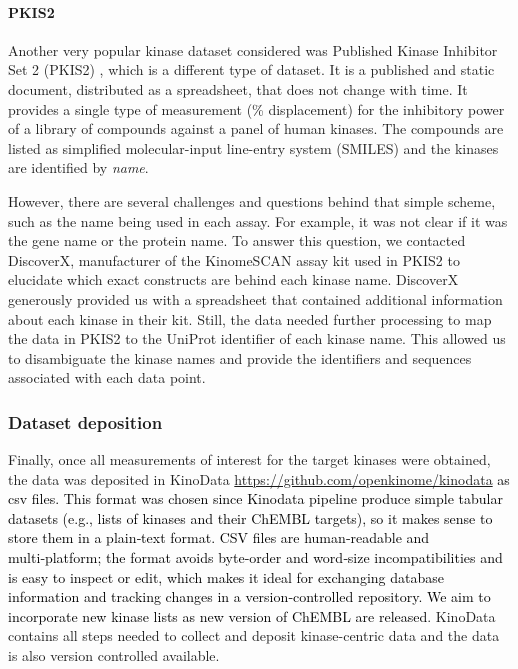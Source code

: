 \documentclass[9pt,lessons]{livecoms}
\newcommand{\revision}[1]{\textcolor{black}{#1}}
\begin{document}
\paragraph{PKIS2}

Another very popular kinase dataset considered was Published Kinase Inhibitor Set 2 (PKIS2) \cite{drewry2017progress}, which is a different type of dataset. 
It is a published and static document, distributed as a spreadsheet, that does not change with time. It provides a single type of measurement (\% displacement) for the inhibitory power of a library of compounds against a panel of human kinases. The compounds are listed as simplified molecular-input line-entry system (SMILES) and the kinases are identified by \emph{name}. 

However, there are several challenges and questions behind that simple scheme, such as the name being used in each assay. For example, it was not clear if it was the gene name or the protein name. To answer this question, we contacted DiscoverX, manufacturer of the KinomeSCAN assay kit used in PKIS2 to elucidate which exact constructs are behind each kinase name. DiscoverX generously provided us with a spreadsheet that contained additional information about each kinase in their kit. 
Still, the data needed further processing to map the data in PKIS2 to the UniProt identifier of each kinase name. This allowed us to disambiguate the kinase names and provide the identifiers and sequences associated with each data point.

\subsubsection{Dataset deposition}

Finally, once all measurements of interest for the target kinases were obtained, the data was deposited in KinoData \url{https://github.com/openkinome/kinodata} \revision{as csv files. This format was chosen since Kinodata pipeline produce simple tabular datasets (e.g., lists of kinases and their ChEMBL targets), so it makes sense to store them in a plain‑text format. CSV files are human‑readable and multi‑platform; the format avoids byte‑order and word‑size incompatibilities and is easy to inspect or edit, which makes it ideal for exchanging database information and tracking changes in a version‑controlled repository. We aim to incorporate new kinase lists as new version of ChEMBL are released}. KinoData contains all steps needed to collect and deposit kinase-centric data and the data is also version controlled available.
\end{document}
